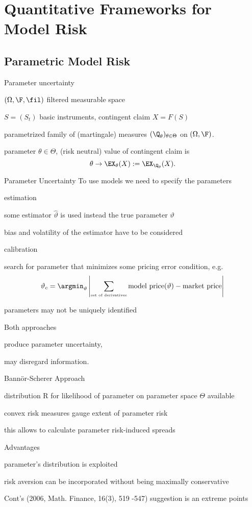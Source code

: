 \section{Quantitative Frameworks for Model Risk}
\subsection{Parametric Model Risk}

{Parameter uncertainty}
\item $(\Omega, \F, \fil)$ filtered measurable space
\item $S= (S_t)$ basic instruments, contingent claim $X=F(S)$
\item parametrized family of (martingale) measures $(\Q_\theta)_{\theta \in \Theta}$ on $(\Omega, \F)$.
\item parameter $\theta \in \Theta$, (risk neutral) value of contingent claim is
$$
\theta \rightarrow \EX_\theta(X) := \EX_{\Q_\theta}(X).
$$


{Parameter Uncertainty}
To use models we need to specify the parameters
\item<1-> estimation
\item some estimator $\hat{\vartheta}$ is used instead the true parameter $\vartheta$
\item bias and volatility of the estimator have to be considered
\item<2-> calibration
\item search for parameter that minimizes some pricing error condition, e.g.
$$
\vartheta_c = \argmin_{\vartheta} \left| \sum_{\mbox{\tiny set of derivatives}} \mbox{model price} (\vartheta) - \mbox{market price} \right|
$$
\item parameters may not be uniquely identified
\item<3-> Both approaches
\item produce parameter uncertainty,
\item may disregard information.

{Bann{\"o}r-Scherer Approach}
\item<1-> distribution R for likelihood of parameter on parameter space $\Theta$  available
\item<2-> convex risk measures gauge extent of parameter risk
\item<3-> this allows to calculate parameter risk-induced spreads
\item<4-> Advantages
\item  parameter's distribution is exploited
 \item risk aversion can be incorporated without being maximally conservative
\item Cont's (2006, Math. Finance, 16(3), 519 -547) suggestion is an extreme points

